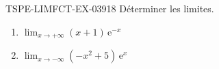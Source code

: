 \begin{exercice}{TSPE-LIMFCT-EX-039}{1}{8}
Déterminer les limites.
\begin{enumerate}
  \item $\lim_{x \to +\infty} (x+1)\,\mathrm{e}^{-x}$
  \item $\lim_{x \to -\infty} (-x^2 + 5)\,\mathrm{e}^x$
\end{enumerate}
\end{exercice}
